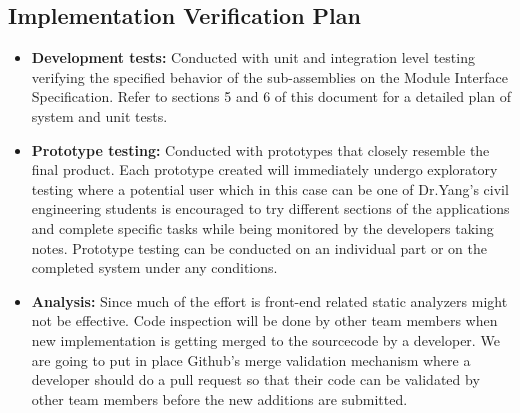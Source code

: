 \documentclass[12pt, titlepage]{article}
\begin{document}
\subsection{Implementation Verification Plan}
\begin{itemize}
  \item\textbf{Development tests:} Conducted with unit and integration level testing verifying the specified behavior of the sub-assemblies on the Module Interface Specification. Refer to sections 5 and 6 of this document for a detailed plan of system and unit tests.
  \item\textbf{Prototype testing:} Conducted with prototypes that closely resemble the final product. Each prototype created will immediately undergo exploratory testing where a potential user which in this case can be one of Dr.Yang’s civil engineering students is encouraged to try different sections of the applications and complete specific tasks while being monitored by the developers taking notes. Prototype testing can be conducted on an individual part or on the completed system under any conditions.
  \item\textbf{Analysis:} Since much of the effort is front-end related static analyzers might not be effective. Code inspection will be done by other team members when new implementation is getting merged to the sourcecode by a developer. We are going to put in place Github’s merge validation mechanism where a developer should do a pull request so that their code can be validated by other team members before the new additions are submitted.
  
\end{itemize}
\end{document}

